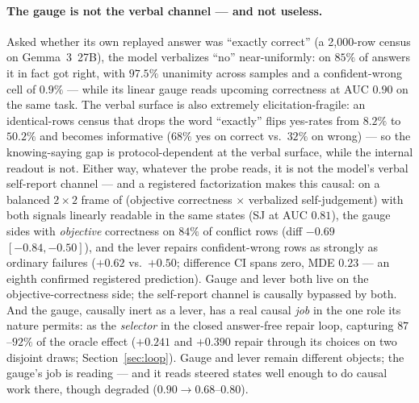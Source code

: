 \documentclass{article} %
\begin{document}
\paragraph{The gauge is not the verbal channel --- and not useless.}
Asked whether its own replayed answer was ``exactly correct'' (a
2{,}000-row census on Gemma~3~27B), the
model verbalizes ``no'' near-uniformly: on $85\%$ of answers it in
fact got right, with $97.5\%$ unanimity across samples and a
confident-wrong cell of $0.9\%$ --- while its linear gauge reads
upcoming correctness at AUC $0.90$ on the same task. The verbal
surface is also extremely elicitation-fragile: an identical-rows
census that drops the word ``exactly'' flips yes-rates from $8.2\%$
to $50.2\%$ and becomes informative ($68\%$ yes on correct vs.\
$32\%$ on wrong) --- so the knowing-saying gap is protocol-dependent
at the verbal surface, while the internal readout is not. Either way,
whatever the
probe reads, it is not the model's verbal self-report channel ---
and a registered factorization makes this causal: on a balanced
$2{\times}2$ frame of (objective correctness $\times$ verbalized
self-judgement) with both signals linearly readable in the same
states (SJ at AUC $0.81$), the gauge sides with \emph{objective}
correctness on $84\%$ of conflict rows (diff $-0.69$
$[-0.84, -0.50]$), and the lever repairs confident-wrong rows as
strongly as ordinary failures ($+0.62$ vs.\ $+0.50$; difference CI
spans zero, MDE $0.23$ --- an eighth confirmed registered
prediction). Gauge and lever both live on the
objective-correctness side; the self-report channel is causally
bypassed by both. And
the gauge, causally inert as a lever, has a real causal \emph{job}
in the one role its nature permits: as the
\emph{selector} in the closed answer-free repair loop, capturing
$87$--$92\%$ of the oracle effect ($+0.241$ and $+0.390$ repair
through its choices on two disjoint draws;
Section~\ref{sec:loop}).
Gauge and
lever remain different objects; the gauge's job is reading --- and it
reads steered states well enough to do causal work there, though
degraded ($0.90 \to 0.68$--$0.80$).
\end{document}
